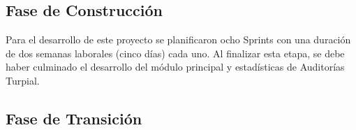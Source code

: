 \subsection{Fase de Construcción}

Para el desarrollo de este proyecto se planificaron ocho Sprints con una duración de dos semanas laborales (cinco días) cada uno. Al finalizar esta etapa, se debe haber culminado el desarrollo del módulo principal y estadísticas de Auditorías Turpial.

\subsection{Fase de Transición}